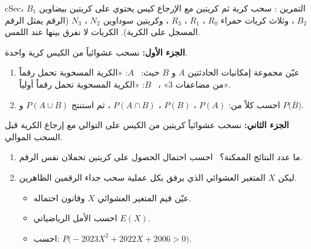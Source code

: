 \documentclass[12pt,a4paper]{article}
\newenvironment{BOX}[2]{\begin{otherlanguage}{english}\begin{arbox}{#1}{#2}}{\end{arbox}\end{otherlanguage}}
\newcounter{exo}
\newenvironment{tamrin}[1]{\stepcounter{exo}\begin{BOX}{cSec}{التمرين \theexo: #1}}{\end{BOX}}
\newenvironment{sq}{\begin{itemize}[leftmargin=2.4em,itemsep=3pt]}{\end{itemize}}
\newcommand{\qa}{\item[(أ)]}\newcommand{\qb}{\item[(ب)]}\newcommand{\qc}{\item[(جـ)]}\newcommand{\qd}{\item[(د)]}\newcommand{\qe}{\item[(هـ)]}
\begin{document}
\begin{tamrin}{سحب كرية ثم كريتين مع الإرجاع}
كيس يحتوي على كريتين بيضاوين $B_1$ ، $B_2$ ، وثلاث كريات حمراء $R_0$ ، $R_1$ ، $R_3$ ، وكريتين سوداوين $N_2$ ، $N_3$ (الرقم يمثل الرقم المسجل على الكرية). الكريات لا نفرق بينها عند اللمس.\par
\textbf{الجزء الأول:} نسحب عشوائياً من الكيس كرية واحدة.
\begin{enumerate}
\item عيّن مجموعة إمكانيات الحادثتين $A$ و $B$ حيث: \ $A$: «الكرية المسحوبة تحمل رقماً من مضاعفات $3$» ، \ $B$: «الكرية المسحوبة تحمل رقماً أولياً».
\item احسب كلاً من: $P(A)$ ، $P(B)$ ، $P(A\cap B)$ ، ثم استنتج $P(A\cup B)$ و $P\big(\overline B\big)$.
\end{enumerate}
\textbf{الجزء الثاني:} نسحب عشوائياً كريتين من الكيس على التوالي مع إرجاع الكرية قبل السحب الموالي.
\begin{enumerate}[resume]
\item ما عدد النتائج الممكنة؟ \ احسب احتمال الحصول على كريتين تحملان نفس الرقم.
\item ليكن $X$ المتغير العشوائي الذي يرفق بكل عملية سحب جداء الرقمين الظاهرين.
\begin{sq}
\qa عيّن قيم المتغير العشوائي $X$ وقانون احتماله.
\qb احسب الأمل الرياضياتي $E(X)$.
\qc احسب: $P\big(-2023X^2+2022X+2006>0\big)$.
\end{sq}
\end{enumerate}
\end{tamrin}
\end{document}
